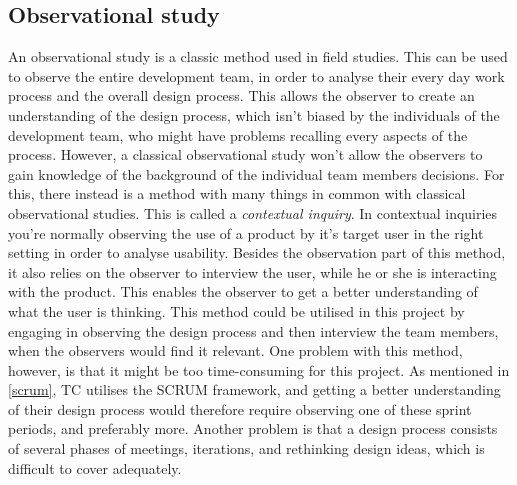 \subsection*{Observational study}
\label{MethodObservation}
An observational study is a classic method used in field studies. This can be used to observe the entire development team, in order to analyse their every day work process and the overall design process. This allows the observer to create an understanding of the design process, which isn't biased by the individuals of the development team, who might have problems recalling every aspects of the process. However, a classical observational study won't allow the observers to gain knowledge of the background of the individual team members decisions. For this, there instead is a method with many things in common with classical observational studies. This is called a \textit{contextual inquiry}. In contextual inquiries you're normally observing the use of a product by it's target user in the right setting in order to analyse usability. Besides the observation part of this method, it also relies on the observer to interview the user, while he or she is interacting with the product. This enables the observer to get a better understanding of what the user is thinking. This method could be utilised in this project by engaging in observing the design process and then interview the team members, when the observers would find it relevant. One problem with this method, however, is that it might be too time-consuming for this project. As mentioned in \autoref{scrum}, TC utilises the SCRUM framework, and getting a better understanding of their design process would therefore require observing one of these sprint periods, and preferably more. Another problem is that a design process consists of several phases of meetings, iterations, and rethinking design ideas, which is difficult to cover adequately.


